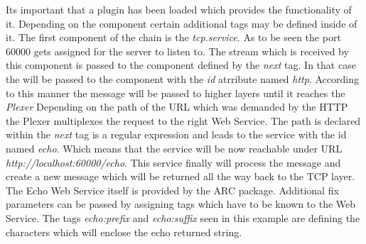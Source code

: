 Its important that a plugin has been loaded which provides the functionality of it.
Depending on the component certain additional tags may be defined inside of it.
The first component of the chain is the \textit{tcp.service}. As to be seen the port 60000 gets assigned for the server to listen to.
The stream which is received by this component is passed to the component defined by the \textit{next} tag.
In that case the will be passed to the component with the \textit{id} atrribute named \textit{http}. According to this manner the message will be passed to higher layers until it reaches the \textit{Plexer}  Depending on the path of the URL which was demanded by the HTTP the Plexer multiplexes the request to the right Web Service. The path is declared within the \textit{next} tag is a regular expression and leads to the service with the id named \textit{echo}. 
Which means that the service will be now reachable under URL \textit{http://localhost:60000/echo}.
This service finally will process the message and create a new message which will be returned all the way back to the TCP layer. The Echo Web Service itself is provided by the ARC package. Additional fix parameters can be passed by assigning tags which have to be known to the Web Service.
The tags \textit{echo:prefix} and \textit{echo:suffix} seen in this example are defining the characters which will enclose the echo  returned string.
\\


